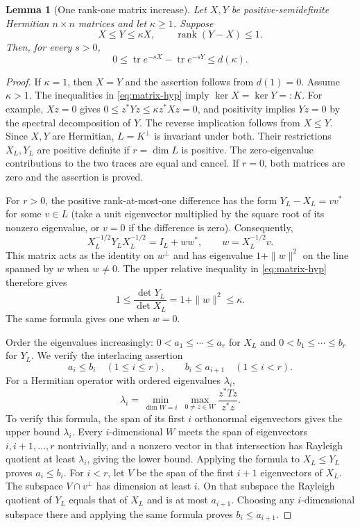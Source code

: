 \documentclass[11pt]{article}
\newtheorem{lemma}{Lemma}
\newcommand{\tr}{\operatorname{tr}}
\newcommand{\rank}{\operatorname{rank}}
\begin{document}
\begin{lemma}[One rank-one matrix increase]\label{lem:matrix}
Let $X,Y$ be positive-semidefinite Hermitian $n\times n$ matrices and
let $\kappa\geq1$. Suppose
\begin{equation}\label{eq:matrix-hyp}
 X\leq Y\leq\kappa X,\qquad \rank(Y-X)\leq1.
\end{equation}
Then, for every $s>0$,
\begin{equation}\label{eq:one-sided}
 0\leq\tr e^{-sX}-\tr e^{-sY}\leq d(\kappa).
\end{equation}
\end{lemma}
\begin{proof}
If $\kappa=1$, then $X=Y$ and the assertion follows from $d(1)=0$.
Assume $\kappa>1$. The inequalities in \eqref{eq:matrix-hyp} imply
$\ker X=\ker Y=:K$. For example, $Xz=0$ gives
$0\leq z^*Yz\leq\kappa z^*Xz=0$, and positivity implies $Yz=0$
by the spectral decomposition of $Y$. The reverse implication follows
from $X\leq Y$. Since $X,Y$ are Hermitian, $L=K^\perp$ is invariant
under both. Their restrictions $X_L,Y_L$ are positive definite if
$r=\dim L$ is positive. The zero-eigenvalue contributions to the two
traces are equal and cancel. If $r=0$, both matrices are zero and
the assertion is proved.

For $r>0$, the positive rank-at-most-one difference has the form
$Y_L-X_L=vv^*$ for some $v\in L$ (take a unit eigenvector multiplied
by the square root of its nonzero eigenvalue, or $v=0$ if the
difference is zero). Consequently,
\[
 X_L^{-1/2}Y_LX_L^{-1/2}=I_L+ww^*,\qquad
 w=X_L^{-1/2}v.
\]
This matrix acts as the identity on $w^\perp$ and has eigenvalue
$1+\|w\|^2$ on the line spanned by $w$ when $w\ne0$.
The upper relative inequality in \eqref{eq:matrix-hyp} therefore gives
\begin{equation}\label{eq:det-bound}
 1\leq\frac{\det Y_L}{\det X_L}
       =1+\|w\|^2\leq\kappa.
\end{equation}
The same formula gives one when $w=0$.

Order the eigenvalues increasingly:
$0<a_1\leq\cdots\leq a_r$ for $X_L$ and
$0<b_1\leq\cdots\leq b_r$ for $Y_L$.
We verify the interlacing assertion
\begin{equation}\label{eq:interlacing}
 a_i\leq b_i\quad(1\leq i\leq r),\qquad
 b_i\leq a_{i+1}\quad(1\leq i<r).
\end{equation}
For a Hermitian operator with ordered eigenvalues $\lambda_i$,
\[
 \lambda_i=\min_{\dim W=i}\ \max_{0\ne z\in W}
                   \frac{z^*Tz}{z^*z}.
\]
To verify this formula, the span of its first $i$ orthonormal
eigenvectors gives the upper bound $\lambda_i$. Every $i$-dimensional
$W$ meets the span of eigenvectors $i,i+1,\ldots,r$ nontrivially,
and a nonzero vector in that intersection has Rayleigh quotient at
least $\lambda_i$, giving the lower bound. Applying the formula to
$X_L\leq Y_L$ proves $a_i\leq b_i$. For $i<r$, let $V$ be the span
of the first $i+1$ eigenvectors of $X_L$. The subspace
$V\cap v^\perp$ has dimension at least $i$. On that subspace the
Rayleigh quotient of $Y_L$ equals that of $X_L$ and is at most
$a_{i+1}$. Choosing any $i$-dimensional subspace there and applying
the same formula proves $b_i\leq a_{i+1}$.


\end{proof}
\end{document}
